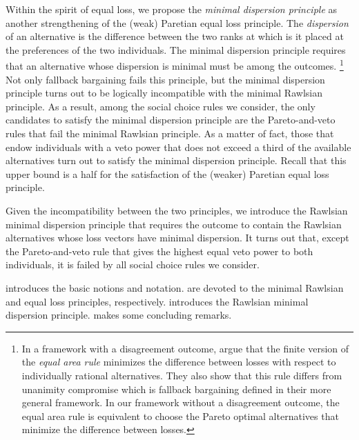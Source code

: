 \documentclass[version=3.21, pagesize, twoside=off, bibliography=totoc, DIV=calc, fontsize=12pt, a4paper]{scrartcl}
\begin{document}
Within the spirit of equal loss, we propose the \textit{minimal dispersion principle} as another strengthening of the (weak) Paretian equal loss principle. The \textit{dispersion} of an alternative is the difference between the two ranks at which is it placed at the preferences of the two individuals. The minimal dispersion principle requires that an alternative whose dispersion is minimal must be among the outcomes.%
\footnote{
\label{ft:equalarea}
In a framework with a disagreement outcome, \citet{KibrisSertel2007} argue that the finite version of the \textit{equal area rule} \citep{thomson1994cooperative} minimizes the difference between losses with respect to individually rational alternatives. They also show that this rule differs from unanimity compromise which is fallback bargaining defined in their more general framework. In our framework without a disagreement outcome, the equal area rule is equivalent to choose the Pareto optimal alternatives that minimize the difference between losses.} 
Not only fallback bargaining fails this principle, but the minimal dispersion principle turns out to be logically incompatible with the minimal Rawlsian principle. As a result, among the social choice rules we consider, the only candidates to satisfy the minimal dispersion principle are the Pareto-and-veto rules that fail the minimal Rawlsian principle. As a matter of fact, those that endow individuals with a veto power that does not exceed a third of the available alternatives turn out to satisfy the minimal dispersion principle. Recall that this upper bound is a half for the satisfaction of the (weaker) Paretian equal loss principle.

Given the incompatibility between the two principles, we introduce the Rawlsian minimal dispersion principle that requires the outcome to contain the Rawlsian alternatives whose loss vectors have minimal dispersion. It turns out that, except the Pareto-and-veto rule that gives the highest equal veto power to both individuals, it is failed by all social choice rules we consider.

 introduces the basic notions and notation.  are devoted to the minimal Rawlsian and equal loss principles, respectively.  introduces the Rawlsian minimal dispersion principle.  makes some concluding remarks.
\end{document}
